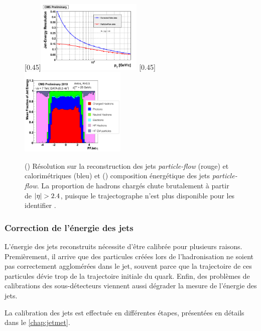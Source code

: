 \begin{figure}[tbp]
    \centering
    \subcaptionbox{\label{fig:pf_vs_calo_jets_reso}}[0.45\textwidth]{\includegraphics[width=0.45\textwidth]{chapitre3/figs/pf_vs_calo_jets.pdf}} \hfill
    \subcaptionbox{\label{fig:pf_jets_composition}}[0.45\textwidth]{\includegraphics[width=0.45\textwidth]{chapitre3/figs/pf_jets_composition.png}}
    \caption{() Résolution sur la reconstruction des jets \emph{particle-flow} (rouge) et calorimétriques (bleu) et () composition énergétique des jets \emph{particle-flow}. La proportion de hadrons chargés chute brutalement à partir de $\lvert \eta \rvert > 2.4$, puisque le trajectographe n'est plus disponible pour les identifier \citep{cms_pf_jets}.}
    \label{fig:pf_jets_perf}
\end{figure}

\subsubsection{Correction de l'énergie des jets}

L'énergie des jets reconstruits nécessite d'être calibrée pour plusieurs raisons. Premièrement, il arrive que des particules créées lors de l'hadronisation ne soient pas correctement agglomérées dans le jet, souvent parce que la trajectoire de ces particules dévie trop de la trajectoire initiale du quark. Enfin, des problèmes de calibrations des sous-détecteurs viennent aussi dégrader la mesure de l'énergie des jets.

La calibration des jets est effectuée en différentes étapes, présentées en détails dans le \cref{chap:jetmet}.

